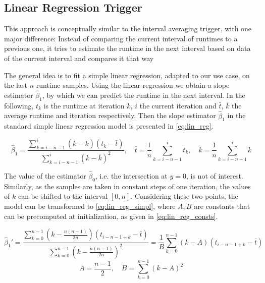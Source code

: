 \subsection{Linear Regression Trigger}
This approach is conceptually similar to the interval averaging trigger, with one major difference: Instead of comparing the current interval of runtimes to a previous one, it tries to estimate the runtime in the next interval based on data of the current interval and compares it that way \textellipsis



The general idea is to fit a simple linear regression, adapted to our use case, on the last $n$ runtime samples. Using the linear regression we obtain a slope estimator $\hat{\beta}_1$, by which we can predict the runtime in the next interval. In the following, $t_k$ is the runtime at iteration $k$, $i$ the current iteration and $\bar t$, $\bar k$ the average runtime and iteration respectively. Then the slope estimator $\hat{\beta}_1$ in the standard simple linear regression model is presented in \eqref{eq:lin_reg}.
 

\begin{equation}
	\hat{\beta}_1=\frac{\sum_{k=i-n-1}^{i}(k-\bar k)(t_k-\bar t)}{\sum_{k=i-n-1}^{i}(k-\bar k)^2},\quad\bar t=\frac{1}{n}\sum_{k=i-n-1}^it_k, \quad \bar k = \frac{1}{n}\sum_{k=i-n-1}^ik\label{eq:lin_reg}
\end{equation}

The value of the estimator $\hat\beta_0$, i.e. the intersection at $y=0$, is not of interest. Similarly, as the samples are taken in constant steps of one iteration, the values of $k$ can be shifted to the interval $[0, n]$. Considering these two points, the model can be transformed to \eqref{eq:lin_reg_simpl}, where $A, B$ are constants that can be precomputed at initialization, as given in \eqref{eq:lin_reg_consts}.

\begin{equation}
\hat{\beta}_1' =\frac{\sum_{k=0}^{n-1}\left(k-\frac{n(n-1)}{2n}\right)(t_{i-n-1+k}-\bar t)}{\sum_{k=0}^{n-1}\left(k-\frac{n(n-1)}{2n}\right)^2}= \frac{1}{B}\sum_{k=0}^{n-1}\left(k-A\right)(t_{i-n-1+k}-\bar t)\label{eq:lin_reg_simpl}
\end{equation}
\begin{equation}
	A = \frac{n-1}{2}, \quad B=\sum_{k=0}^{n-1}\left(k-A\right)^2\label{eq:lin_reg_consts}
\end{equation}


